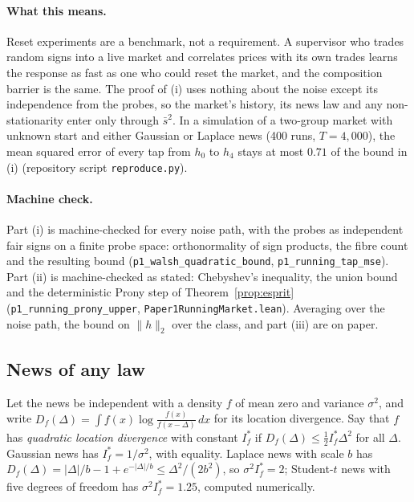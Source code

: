\documentclass[12pt]{article}
\theoremstyle{definition}
\theoremstyle{remark}
\begin{document}
\paragraph{What this means.} Reset experiments are a benchmark, not a requirement. A supervisor who trades random signs into a live market and correlates prices with its own trades learns the response as fast as one who could reset the market, and the composition barrier is the same. The proof of (i) uses nothing about the noise except its independence from the probes, so the market's history, its news law and any non-stationarity enter only through $\bar s^2$. In a simulation of a two-group market with unknown start and either Gaussian or Laplace news (400 runs, $T=4{,}000$), the mean squared error of every tap from $h_0$ to $h_4$ stays at most $0.71$ of the bound in (i) (repository script \nolinkurl{reproduce.py}).

\paragraph{Machine check.} Part (i) is machine-checked for every noise path, with the probes as independent fair signs on a finite probe space: orthonormality of sign products, the fibre count and the resulting bound (\texttt{p1\_walsh\_quadratic\_bound}, \texttt{p1\_running\_tap\_mse}). Part (ii) is machine-checked as stated: Chebyshev's inequality, the union bound and the deterministic Prony step of Theorem~\ref{prop:esprit} (\texttt{p1\_running\_prony\_upper}, \nolinkurl{Paper1RunningMarket.lean}). Averaging over the noise path, the bound on $\|h\|_2$ over the class, and part (iii) are on paper.

\subsection{News of any law}

Let the news be independent with a density $f$ of mean zero and variance $\sigma^2$, and write $D_f(\Delta)=\int f(x)\log\frac{f(x)}{f(x-\Delta)}\,dx$ for its location divergence. Say that $f$ has \emph{quadratic location divergence} with constant $I^*_f$ if $D_f(\Delta)\le\frac12I^*_f\Delta^2$ for all $\Delta$. Gaussian news has $I^*_f=1/\sigma^2$, with equality. Laplace news with scale $b$ has $D_f(\Delta)=|\Delta|/b-1+e^{-|\Delta|/b}\le\Delta^2/(2b^2)$, so $\sigma^2I^*_f=2$; Student-$t$ news with five degrees of freedom has $\sigma^2I^*_f=1.25$, computed numerically.
\end{document}
